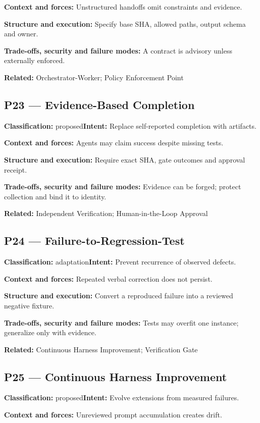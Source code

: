 \documentclass[11pt,letterpaper]{article}
\begin{document}
\textbf{Context and forces:} Unstructured handoffs omit constraints and evidence.

\textbf{Structure and execution:} Specify base SHA, allowed paths, output schema and owner.

\textbf{Trade-offs, security and failure modes:} A contract is advisory unless externally enforced.

\textbf{Related:} Orchestrator-Worker; Policy Enforcement Point

\subsection*{P23 --- Evidence-Based Completion}
\textbf{Classification:} proposed\quad\textbf{Intent:} Replace self-reported completion with artifacts.

\textbf{Context and forces:} Agents may claim success despite missing tests.

\textbf{Structure and execution:} Require exact SHA, gate outcomes and approval receipt.

\textbf{Trade-offs, security and failure modes:} Evidence can be forged; protect collection and bind it to identity.

\textbf{Related:} Independent Verification; Human-in-the-Loop Approval

\subsection*{P24 --- Failure-to-Regression-Test}
\textbf{Classification:} adaptation\quad\textbf{Intent:} Prevent recurrence of observed defects.

\textbf{Context and forces:} Repeated verbal correction does not persist.

\textbf{Structure and execution:} Convert a reproduced failure into a reviewed negative fixture.

\textbf{Trade-offs, security and failure modes:} Tests may overfit one instance; generalize only with evidence.

\textbf{Related:} Continuous Harness Improvement; Verification Gate

\subsection*{P25 --- Continuous Harness Improvement}
\textbf{Classification:} proposed\quad\textbf{Intent:} Evolve extensions from measured failures.

\textbf{Context and forces:} Unreviewed prompt accumulation creates drift.
\end{document}
